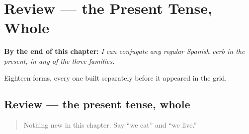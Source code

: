 
\chapter{Review --- the Present Tense, Whole}
\label{ch:spanish-review-present-all}

\begin{chapteropening}
\textbf{By the end of this chapter:} \emph{I can conjugate any regular Spanish verb in the present, in any of the three families.}

Eighteen forms, every one built separately before it appeared in the grid.
\end{chapteropening}

\section[Practice]{Review — the present tense, whole}

\label{lesson:ES-C07-repaso-tres-familias}



\begin{quote}
Nothing new in this chapter. Say \textquotedblleft{}we eat\textquotedblright{} and \textquotedblleft{}we live.\textquotedblright{}
\end{quote}

